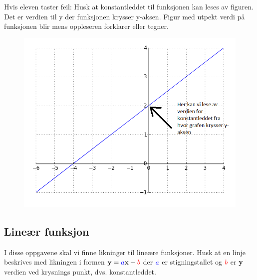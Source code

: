 \documentclass[12pt,twoside,onecolumn]{article}
\begin{document}
\begin{Exercise}
{\color{Maroon}Hvis eleven taster feil:} \newline
{\color{gray}Husk at konstantleddet til funksjonen kan leses av figuren. Det er verdien til y der funksjonen krysser y-aksen.}
{\color{Maroon}Figur med utpekt verdi på funksjonen blir mens oppleseren forklarer eller tegner.}
\begin{figure}[h!]
\centering
\includegraphics[scale = 0.4]{figures/konstantleddeksempelet.png}
\end{figure}
\end{Exercise}

\subsection*{Lineær funksjon}
I disse oppgavene  skal vi finne likninger til lineære funksjoner. Husk at en linje beskrives med likningen i formen $\mathbf{y} = {\color{blue}a}\mathbf{x}+ {\color{red}b}$ der ${\color{blue}a}$ er {\color{blue}stigningstallet} og ${\color{red}b}$ er \textbf{y} verdien ved krysnings punkt, dvs. {\color{red}konstantleddet}.
\end{document}
